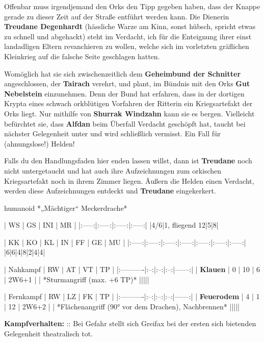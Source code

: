 Offenbar muss irgendjemand den Orks den Tipp gegeben haben, dass der Knappe gerade zu dieser Zeit auf der Straße entführt werden kann.
Die Dienerin \textbf{Treudane Degenhardt} (hässliche Warze am Kinn, sonst hübsch, spricht etwas zu schnell und abgehackt) steht im Verdacht, 
ich für die Enteignung ihrer einst landadligen Eltern revanchieren zu wollen, welche sich im vorletzten gräflichen Kleinkrieg auf die falsche Seite geschlagen hatten.

Womöglich hat sie sich zwischenzeitlich dem \textbf{Geheimbund der Schnitter} angeschlossen, der \textbf{Tairach} verehrt, und plant, im Bündnis mit den Orks \textbf{Gut Nebelstein} einzunehmen.
Denn der Bund hat erfahren, dass in der dortigen Krypta eines schwach orkblütigen Vorfahren der Ritterin ein Kriegsartefakt der Orks liegt.
Nur mithilfe von \textbf{Shurrak Windzahn} kann sie es bergen. Vielleicht befürchtet sie, dass \textbf{Alfdan} beim Überfall Verdacht geschöpft hat, taucht bei nächster Gelegenheit unter und wird schließlich vermisst.
Ein Fall für (ahnungslose!) Helden!


Falls du den Handlungsfaden hier enden lassen willst, dann ist \textbf{Treudane} noch nicht untergetaucht und hat auch ihre Aufzeichnungen zum orkischen Kriegsartefakt noch in ihrem Zimmer liegen.
Äußern die Helden einen Verdacht, werden diese Aufzeichnungen entdeckt und \textbf{Treudane} eingekerkert.


\spaltenende

\neueseite


\spaltenanfang


\label{greifax}
 {{humanoid
 *„Mächtiger“ Meckerdrache*


 |  WS  |  GS  |  INI  |  MR | 
 |:-----:|:-----:|:-----:|:-----:|
 |4/6|1, fliegend 12|5|8|


 |  KK  |  KO  |  KL  |  IN  |  FF  |  GE  |  MU  |
 |:-----:|:-----:|:-----:|:-----:|:-----:|:-----:|:-----:|
 |6|6|4|8|2|4|4|


 | Nahkampf  | RW | AT | VT | TP    |
 |:----------|:--:|:--:|:--:|------:|
 | \textbf{Klauen} | 0  | 10 | 6 | 2W6+1 |
 | *Sturmangriff (max. +6 TP)* |||||

 | Fernkampf  | RW | LZ | FK | TP    |
 |:----------|:--:|:--:|:--:|------:|
 | \textbf{Feuerodem} | 4  | 1 | 12 | 2W6+2 |
 | *Flächenangriff (90° vor dem Drachen), Nachbrennen* |||||


 \textbf{Kampfverhalten:} :: Bei Gefahr stellt sich Greifax bei der ersten sich bietenden Gelegenheit theatralisch tot.


 }}


